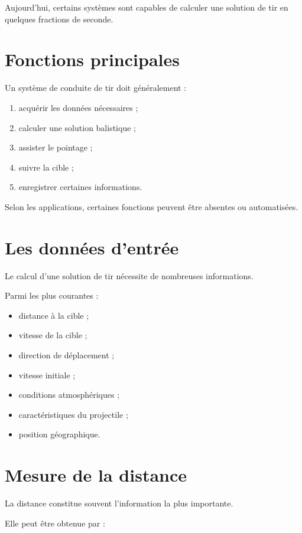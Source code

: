 Aujourd'hui, certains systèmes sont capables de calculer une solution de tir
en quelques fractions de seconde.

\section{Fonctions principales}

Un système de conduite de tir doit généralement :

\begin{enumerate}
    \item acquérir les données nécessaires ;
    \item calculer une solution balistique ;
    \item assister le pointage ;
    \item suivre la cible ;
    \item enregistrer certaines informations.
\end{enumerate}

Selon les applications, certaines fonctions peuvent être absentes ou
automatisées.

\section{Les données d'entrée}

Le calcul d'une solution de tir nécessite de nombreuses informations.

Parmi les plus courantes :

\begin{itemize}
    \item distance à la cible ;
    \item vitesse de la cible ;
    \item direction de déplacement ;
    \item vitesse initiale ;
    \item conditions atmosphériques ;
    \item caractéristiques du projectile ;
    \item position géographique.
\end{itemize}

\section{Mesure de la distance}

La distance constitue souvent l'information la plus importante.

Elle peut être obtenue par :

